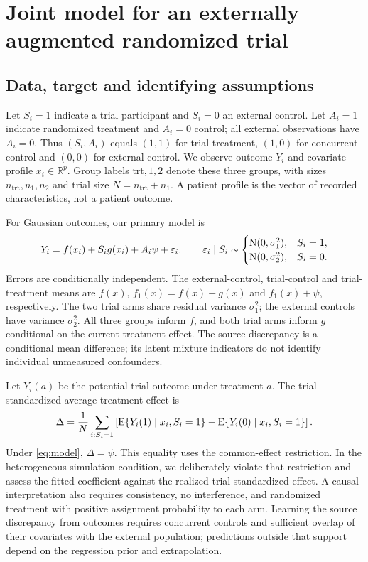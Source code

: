 \documentclass[11pt]{article}
\begin{document}
\section{Joint model for an externally augmented randomized trial}\label{sec:model}
\subsection{Data, target and identifying assumptions}
Let $S_i=1$ indicate a trial participant and $S_i=0$ an external control. Let $A_i=1$ indicate randomized treatment and $A_i=0$ control; all external observations have $A_i=0$. Thus $(S_i,A_i)$ equals $(1,1)$ for trial treatment, $(1,0)$ for concurrent control and $(0,0)$ for external control. We observe outcome $Y_i$ and covariate profile $x_i\in\mathbb R^p$. Group labels $\mathrm{trt},1,2$ denote these three groups, with sizes $n_{\mathrm{trt}},n_1,n_2$ and trial size $N=n_{\mathrm{trt}}+n_1$. A patient profile is the vector of recorded characteristics, not a patient outcome.

For Gaussian outcomes, our primary model is
\begin{equation}\label{eq:model}
Y_i=f(x_i)+S_i g(x_i)+A_i\psi+\varepsilon_i,\qquad
\varepsilon_i\mid S_i\sim
\begin{cases}\mathrm{N}(0,\sigma_1^2),&S_i=1,\\
\mathrm{N}(0,\sigma_2^2),&S_i=0.
\end{cases}
\end{equation}
Errors are conditionally independent. The external-control, trial-control and trial-treatment means are $f(x)$, $f_1(x)=f(x)+g(x)$ and $f_1(x)+\psi$, respectively. The two trial arms share residual variance $\sigma_1^2$; the external controls have variance $\sigma_2^2$. All three groups inform $f$, and both trial arms inform $g$ conditional on the current treatment effect. The source discrepancy is a conditional mean difference; its latent mixture indicators do not identify individual unmeasured confounders.

Let $Y_i(a)$ be the potential trial outcome under treatment $a$. The trial-standardized average treatment effect is
\begin{equation}\label{eq:contrast}
\Delta=\frac1N\sum_{i:S_i=1}
\left[\operatorname{E}\{Y_i(1)\mid x_i,S_i=1\}-\operatorname{E}\{Y_i(0)\mid x_i,S_i=1\}\right].
\end{equation}
Under \eqref{eq:model}, $\Delta=\psi$. This equality uses the common-effect restriction. In the heterogeneous simulation condition, we deliberately violate that restriction and assess the fitted coefficient against the realized trial-standardized effect. A causal interpretation also requires consistency, no interference, and randomized treatment with positive assignment probability to each arm. Learning the source discrepancy from outcomes requires concurrent controls and sufficient overlap of their covariates with the external population; predictions outside that support depend on the regression prior and extrapolation.
\end{document}
